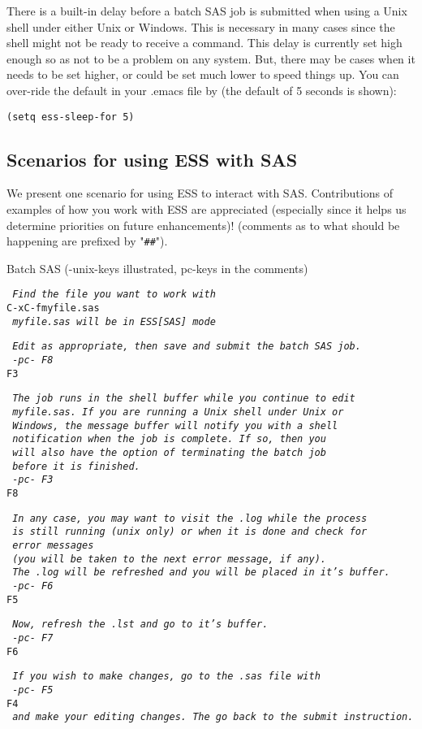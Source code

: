 \documentclass{article}
\newcommand*{\Scmt}[1]{\hbox{\qquad {\footnotesize \#\#} \textsl{#1}}}
\newenvironment{Salltt}{\small\begin{alltt}}{\end{alltt}}
\begin{document}
There is a built-in delay before a batch SAS job is submitted when using
a Unix shell under either Unix or Windows.  This is necessary in many cases 
since the shell might not be ready to receive a command.  This delay is 
currently set high enough so as not to be a problem on any system.  But,
there may be cases when it needs to be set higher, or could be set much
lower to speed things up.  You can over-ride the default in your .emacs
file by (the default of 5 seconds is shown):
\begin{verbatim}
(setq ess-sleep-for 5)
\end{verbatim}

\subsection{Scenarios for using ESS with SAS}
\label{sec:SAS:scen}

We present one scenario for using ESS to interact with SAS.
Contributions of examples of how you work with ESS are appreciated
(especially since it helps us determine priorities on future
enhancements)! (comments as to what should be happening are prefixed
by "\verb+##+").

Batch SAS (-unix-keys illustrated, pc-keys in the comments)
\begin{Salltt}
    \Scmt{Find the file you want to work with}
    C-x C-f myfile.sas
    \Scmt{myfile.sas will be in ESS[SAS] mode}

    \Scmt{Edit as appropriate, then save and submit the batch SAS job.}
    \Scmt{-pc- F8}
    F3

    \Scmt{The job runs in the shell buffer while you continue to edit }
    \Scmt{myfile.sas.  If you are running a Unix shell under Unix or}
    \Scmt{Windows, the message buffer will notify you with a shell}
    \Scmt{notification when the job is complete.  If so, then you }
    \Scmt{will also have the option of terminating the batch job}
    \Scmt{before it is finished.}
    \Scmt{-pc- F3}
    F8

    \Scmt{In any case, you may want to visit the .log while the process}
    \Scmt{is still running (unix only) or when it is done and check for}
    \Scmt{error messages }
    \Scmt{(you will be taken to the next error message, if any).}
    \Scmt{The .log will be refreshed and you will be placed in it's buffer.}
    \Scmt{-pc- F6}
    F5

    \Scmt{Now, refresh the .lst and go to it's buffer.}
    \Scmt{-pc- F7}
    F6

    \Scmt{If you wish to make changes, go to the .sas file with}
    \Scmt{-pc- F5}
    F4
    \Scmt{and make your editing changes.  The go back to the submit instruction.}
\end{Salltt}
\end{document}
